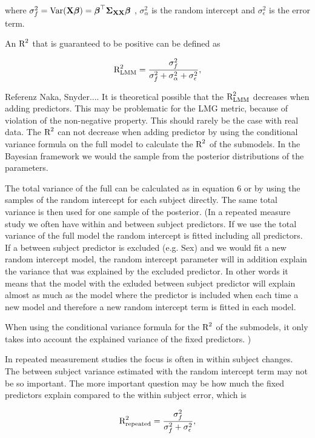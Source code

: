 \documentclass[11pt,a4paper,twoside]{book}\usepackage[]{graphicx}\usepackage[]{color}
\begin{document}
where $\sigma_{f}^2 = \operatorname{Var}({\mathbf{X}} {\boldsymbol{\beta}}) = {\boldsymbol{\beta}}^\top {\boldsymbol{\Sigma}}{}_{{\mathbf{X}} {\mathbf{X}}}  {\boldsymbol{\beta}}$ , $\sigma_{\alpha}^2 $ is the random intercept and $\sigma_{\epsilon}^2$ is the error term. 

An $\text{R}^2$ that is guaranteed to be positive can be defined as

   \begin{align} 
\text{R}^2_{\text{LMM}} = \frac{\sigma_{f}^2}{\sigma_{f}^2 + \sigma_{\alpha}^2 + \sigma_{\epsilon}^2},
\end{align}

Referenz Naka, Snyder.... It is theoretical possible that the $\text{R}^2_{\text{LMM}}$ decreases when adding predictors. This may be problematic for the LMG metric, because of violation of the non-negative property. This should rarely be the case with real data. The $\text{R}^2$ can not decrease when adding predictor by using the conditional variance formula on the full model to calculate the $\text{R}^2$ of the submodels. In the Bayesian framework we would the sample from the posterior distributions of the parameters. 

The total variance of the full can be calculated as in equation 6 or by using the samples of the random intercept for each subject directly. The same total variance is then used for one sample of the posterior. (In a repeated measure study we often have within and between subject predictors. If we use the total variance of the full model the random intercept is fitted including all predictors. If a between subject predictor is excluded (e.g. Sex) and we would fit a new random intercept model, the random intercept parameter will in addition explain the variance that was explained by the excluded predictor. In other words it means that the model with the exluded between subject predictor will explain almost as much as the model where the predictor is included when each time a new model and therefore a new random intercept term is fitted in each model. 

When using the conditional variance formula for the $\text{R}^2$ of the submodels, it only takes into account the explained variance of the fixed predictors. )


In repeated measurement studies the focus is often in within subject changes. The between subject variance estimated with the random intercept term may not be so important. The more important question may be how much the fixed predictors explain compared to the within subject error, which is

   \begin{align} 
\text{R}^2_{\text{repeated}} = \frac{\sigma_{f}^2}{\sigma_{f}^2  + \sigma_{\epsilon}^2},
\end{align}
\end{document}
